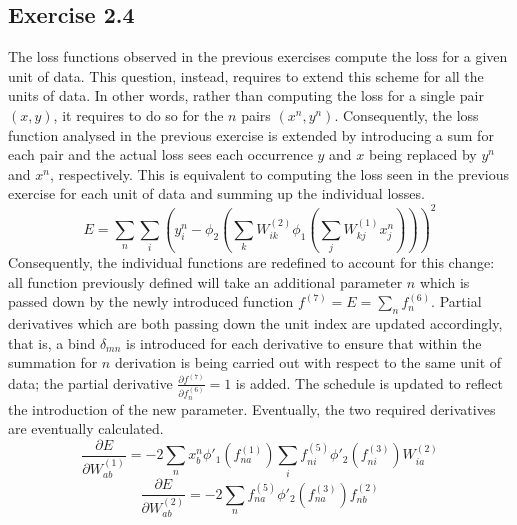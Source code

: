 \documentclass[fleqn]{article}
\begin{document}
\subsection*{Exercise 2.4}
The loss functions observed in the previous exercises compute the loss for a given unit of data. This question, instead, requires to extend this scheme for all the units of data. In other words, rather than computing the loss for a single pair $(x, y)$, it requires to do so for the $n$ pairs $(x^n, y^n)$. Consequently, the loss function analysed in the previous exercise is extended by introducing a sum for each pair and the actual loss sees each occurrence $y$ and $x$ being replaced by $y^n$ and $x^n$, respectively. This is equivalent to computing the loss seen in the previous exercise for each unit of data and summing up the individual losses.
\begin{equation}
    E=\sum_n \sum_i \left ( y^n_i - \phi_2 \left ( \sum_k W^{(2)}_{ik} \phi_1 \left ( \sum_j W^{(1)}_{kj} x^n_j \right ) \right ) \right )^2
\end{equation}
Consequently, the individual functions are redefined to account for this change: all function previously defined will take an additional parameter $n$ which is passed down by the newly introduced function $f^{(7)} = E = \sum_n f^{(6)}_n$. Partial derivatives which are both passing down the unit index are updated accordingly, that is, a bind $\delta_{mn}$ is introduced for each derivative to ensure that within the summation for $n$ derivation is being carried out with respect to the same unit of data; the partial derivative $\frac{\partial f^{(7)}}{\partial f^{(6)}_{n}} = 1$ is added. The schedule is updated to reflect the introduction of the new parameter. Eventually, the two required derivatives are eventually calculated.
\begin{equation}
    \frac{\partial E}{\partial W^{(1)}_{ab}} =  - 2 \sum_n x^n_b \phi'_1 \left (f^{(1)}_{na} \right ) \sum_i f^{(5)}_{ni} \phi'_2 \left ( f^{(3)}_{ni} \right ) W^{(2)}_{ia}
\end{equation}
\begin{equation}
    \frac{\partial E}{\partial W^{(2)}_{ab}} = - 2 \sum_n f^{(5)}_{na} \phi'_2 \left ( f^{(3)}_{na} \right ) f^{(2)}_{nb}
\end{equation}
\end{document}
